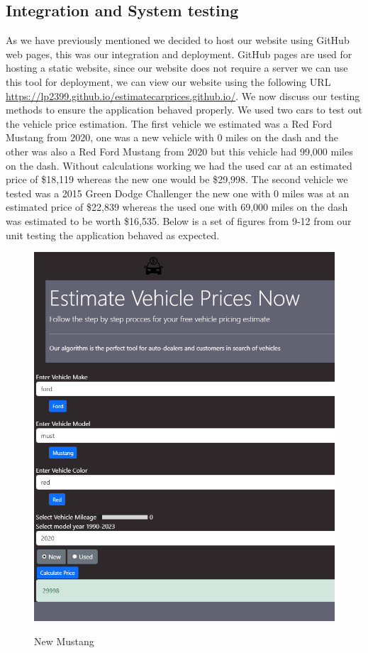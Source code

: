 \documentclass[12pt]{article}
\begin{document}
\subsection{Integration and System testing}
As we have previously mentioned we decided to host our website using GitHub web pages\cite{pages.github}, this was our integration and deployment. GitHub pages are used for hosting a static website, since our website does not require a server we can use this tool for deployment, we can view our website using the following URL \url{https://lp2399.github.io/estimatecarprices.github.io/}. We now discuss our testing methods to ensure the application behaved properly. We used two cars to test out the vehicle price estimation. The first vehicle we estimated was a Red Ford Mustang from 2020, one was a new vehicle with 0 miles on the dash and the other was also a Red Ford Mustang from 2020 but this vehicle had 99,000 miles on the dash. Without calculations working we had the used car at an estimated price of \$18,119 whereas the new one would be \$29,998. The second vehicle we tested was a 2015 Green Dodge Challenger the new one with 0 miles was at an estimated price of \$22,839 whereas the used one with 69,000 miles on the dash was estimated to be worth \$16,535. Below is a set of figures from 9-12 from our unit testing the application behaved as expected.  
\begin{figure}[H]
\caption{New Mustang}
\centering
\includegraphics[scale=.6]{figures/New mustang.png}\\
\end{figure}
\end{document}
